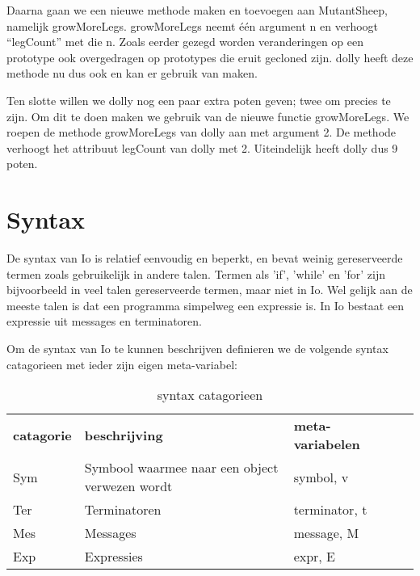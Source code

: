\documentclass[12pt]{article}
\begin{document}
Daarna gaan we een nieuwe methode maken en toevoegen aan MutantSheep, namelijk growMoreLegs.
growMoreLegs neemt \'e\'en argument n en verhoogt ``legCount'' met die n. Zoals eerder gezegd worden veranderingen op een prototype ook overgedragen op prototypes die eruit gecloned zijn. dolly heeft deze methode nu dus ook en kan er gebruik van maken.\newline

Ten slotte willen we dolly nog een paar extra poten geven; twee om precies te zijn.
Om dit te doen maken we gebruik van de nieuwe functie growMoreLegs.
We roepen de methode growMoreLegs van dolly aan met argument 2.
De methode verhoogt het attribuut legCount van dolly met 2.
Uiteindelijk heeft dolly dus 9 poten.


\section{Syntax}

De syntax van Io is relatief eenvoudig en beperkt, en bevat weinig gereserveerde termen zoals gebruikelijk in andere talen. Termen als 'if', 'while' en 'for' zijn bijvoorbeeld in veel talen gereserveerde termen, maar niet in Io. Wel gelijk aan de meeste talen is dat een programma simpelweg een expressie is. In Io bestaat een expressie uit messages en terminatoren. 

Om de syntax van Io te kunnen beschrijven definieren we de volgende syntax catagorieen met ieder zijn eigen meta-variabel:

\begin{table}[]
	\centering
	\begin{tabular}{lllll}
		\textbf{catagorie} & \textbf{beschrijving}                          & \textbf{meta-variabelen} &  &  \\
		Sym                & Symbool waarmee naar een object verwezen wordt & symbol, v                      &  &  \\
		Ter                & Terminatoren                                   & terminator, t                      &  &  \\
		Mes                & Messages                                       & message, M                      &  &  \\
		Exp                & Expressies                                     & expr, E                      &  & 
	\end{tabular}
	\label{catagorieen}
	\caption{syntax catagorieen}
\end{table} 
\end{document}
